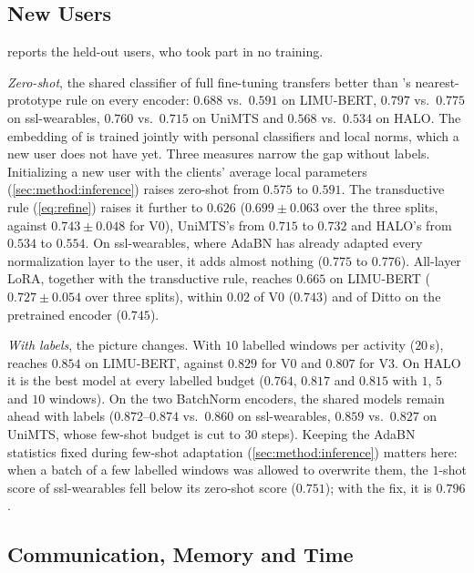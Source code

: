 \subsection{New Users}\label{sec:results:newusers}

 reports the held-out users, who took part in no training.

\emph{Zero-shot}, the shared classifier of full fine-tuning transfers better than \method{}'s
nearest-prototype rule on every encoder: $0.688$ vs.\ $0.591$ on LIMU-BERT, $0.797$ vs.\ $0.775$ on
ssl-wearables, $0.760$ vs.\ $0.715$ on UniMTS and $0.568$ vs.\ $0.534$ on HALO.
The embedding of \method{} is trained jointly with personal classifiers and local norms, which a new
user does not have yet. Three measures narrow the gap without labels. Initializing a new user with the
clients' average local parameters (\cref{sec:method:inference}) raises zero-shot from $0.575$ to
$0.591$. The transductive rule (\cref{eq:refine}) raises it further to $0.626$ ($0.699\pm0.063$ over the
three splits, against $0.743\pm0.048$ for V0), UniMTS's from $0.715$ to $0.732$ and HALO's from
$0.534$ to $0.554$. On ssl-wearables, where AdaBN has already adapted every normalization layer to the
user, it adds almost nothing ($0.775$ to $0.776$). All-layer LoRA, together with the transductive rule, reaches $0.665$ on LIMU-BERT
($0.727\pm0.054$ over three splits), within $0.02$ of V0 ($0.743$) and of Ditto on the pretrained
encoder ($0.745$).

\emph{With labels}, the picture changes. With $10$ labelled windows per activity ($20$\,s),
\method{} reaches $0.854$ on LIMU-BERT, against $0.829$ for V0 and $0.807$ for V3. On HALO it is the best
model at every labelled budget ($0.764$, $0.817$ and $0.815$ with $1$, $5$ and $10$ windows). On the
two BatchNorm encoders, the shared models remain ahead with labels ($0.872$--$0.874$ vs.\ $0.860$ on
ssl-wearables, $0.859$ vs.\ $0.827$ on UniMTS, whose few-shot budget is cut to $30$ steps). Keeping the
AdaBN statistics fixed during few-shot adaptation (\cref{sec:method:inference}) matters here: when a
batch of a few labelled windows was allowed to overwrite them, the $1$-shot score of ssl-wearables fell
below its zero-shot score ($0.751$); with the fix, it is $0.796$.

\subsection{Communication, Memory and Time}\label{sec:results:cost}

